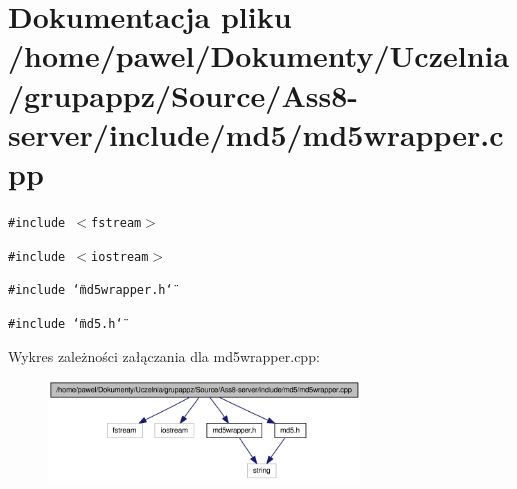 \hypertarget{a00011}{
\section{Dokumentacja pliku /home/pawel/Dokumenty/Uczelnia/grupappz/Source/Ass8-server/include/md5/md5wrapper.cpp}
\label{da/d45/a00011}
}
{\tt \#include $<$fstream$>$}\par
{\tt \#include $<$iostream$>$}\par
{\tt \#include \char`\"{}md5wrapper.h\char`\"{}}\par
{\tt \#include \char`\"{}md5.h\char`\"{}}\par


Wykres zależności załączania dla md5wrapper.cpp:\nopagebreak
\begin{figure}[H]
\begin{center}
\leavevmode
\includegraphics[width=234pt]{d5/db6/a00042}
\end{center}
\end{figure}

